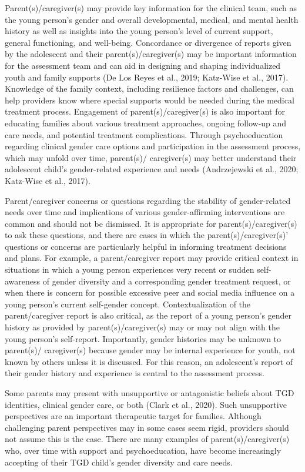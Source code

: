 \documentclass[
]{book}
\begin{document}
Parent(s)/caregiver(s) may provide key information for the clinical team, such as the young person's gender and overall developmental, medical,
and mental health history as well as insights into
the young person's level of current support, general
functioning, and well-being. Concordance or divergence of reports given by the adolescent and their
parent(s)/caregiver(s) may be important information for the assessment team and can aid in
designing and shaping individualized youth and
family supports (De Los Reyes et al., 2019;
Katz-Wise et al., 2017). Knowledge of the family
context, including resilience factors and challenges,
can help providers know where special supports
would be needed during the medical treatment
process. Engagement of parent(s)/caregiver(s) is
also important for educating families about various
treatment approaches, ongoing follow-up and care
needs, and potential treatment complications.
Through psychoeducation regarding clinical gender
care options and participation in the assessment
process, which may unfold over time, parent(s)/
caregiver(s) may better understand their adolescent
child's gender-related experience and needs
(Andrzejewski et al., 2020; Katz-Wise et al., 2017).

Parent/caregiver concerns or questions regarding the stability of gender-related needs over time
and implications of various gender-affirming
interventions are common and should not be
dismissed. It is appropriate for parent(s)/caregiver(s) to ask these questions, and there are
cases in which the parent(s)/caregiver(s)' questions or concerns are particularly helpful in
informing treatment decisions and plans. For
example, a parent/caregiver report may provide
critical context in situations in which a young
person experiences very recent or sudden
self-awareness of gender diversity and a corresponding gender treatment request, or when there
is concern for possible excessive peer and social
media influence on a young person's current
self-gender concept. Contextualization of the parent/caregiver report is also critical, as the report
of a young person's gender history as provided
by parent(s)/caregiver(s) may or may not align
with the young person's self-report. Importantly,
gender histories may be unknown to parent(s)/
caregiver(s) because gender may be internal experience for youth, not known by others unless it
is discussed. For this reason, an adolescent's
report of their gender history and experience is
central to the assessment process.

Some parents may present with unsupportive
or antagonistic beliefs about TGD identities, clinical gender care, or both (Clark et al., 2020).
Such unsupportive perspectives are an important
therapeutic target for families. Although challenging parent perspectives may in some cases seem
rigid, providers should not assume this is the
case. There are many examples of parent(s)/caregiver(s) who, over time with support and psychoeducation, have become increasingly accepting
of their TGD child's gender diversity and
care needs.
\end{document}
